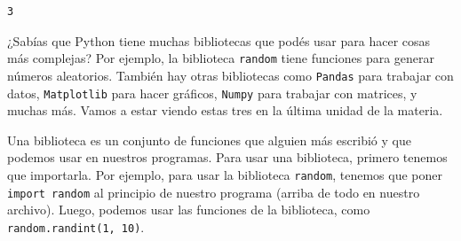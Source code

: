 \documentclass[
  letterpaper,
  DIV=11,
  numbers=noendperiod]{scrreprt}
\begin{document}
\begin{verbatim}
3
\end{verbatim}

\begin{tcolorbox}[enhanced jigsaw, bottomrule=.15mm, leftrule=.75mm, opacityback=0, colback=white, toprule=.15mm, bottomtitle=1mm, opacitybacktitle=0.6, rightrule=.15mm, left=2mm, arc=.35mm, coltitle=black, title=\textcolor{quarto-callout-note-color}{\faInfo}\hspace{0.5em}{Tip: Bibliotecas}, breakable, toptitle=1mm, colframe=quarto-callout-note-color-frame, titlerule=0mm, colbacktitle=quarto-callout-note-color!10!white]

¿Sabías que Python tiene muchas bibliotecas que podés usar para hacer
cosas más complejas? Por ejemplo, la biblioteca \texttt{random} tiene
funciones para generar números aleatorios. También hay otras bibliotecas
como \texttt{Pandas} para trabajar con datos, \texttt{Matplotlib} para
hacer gráficos, \texttt{Numpy} para trabajar con matrices, y muchas más.
Vamos a estar viendo estas tres en la última unidad de la materia.

Una biblioteca es un conjunto de funciones que alguien más escribió y
que podemos usar en nuestros programas. Para usar una biblioteca,
primero tenemos que importarla. Por ejemplo, para usar la biblioteca
\texttt{random}, tenemos que poner \texttt{import\ random} al principio
de nuestro programa (arriba de todo en nuestro archivo). Luego, podemos
usar las funciones de la biblioteca, como
\texttt{random.randint(1,\ 10)}.

\end{tcolorbox}
\end{document}
